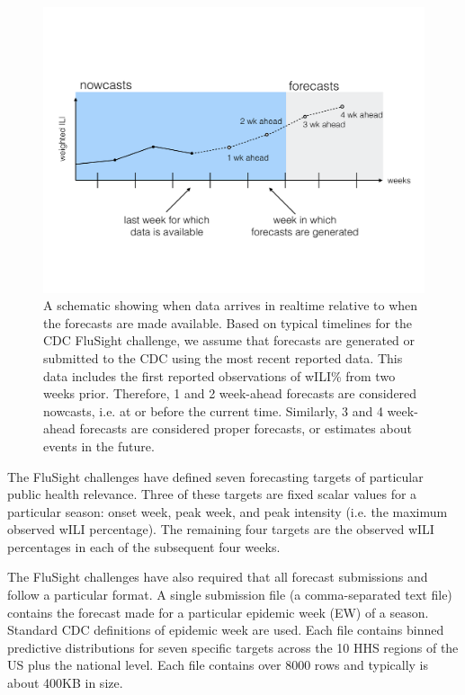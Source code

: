 \documentclass{article}\usepackage[]{graphicx}\usepackage[]{color}
\begin{document}
\begin{figure}[htbp]
\begin{center}
\includegraphics[width=\textwidth]{static-figures/timezero-sketch.pdf}
\caption{A schematic showing when data arrives in realtime relative to when the forecasts are made available. Based on typical timelines for the CDC FluSight challenge, we assume that forecasts are generated or submitted to the CDC using the most recent reported data. This data includes the first reported observations of wILI\% from two weeks prior. Therefore, 1 and 2 week-ahead forecasts are considered nowcasts, i.e. at or before the current time. Similarly, 3 and 4 week-ahead forecasts are considered proper forecasts, or estimates about events in the future.}
\label{fig:timezero-schematic}
\end{center}
\end{figure}


The FluSight challenges have defined seven forecasting targets of particular public health relevance. Three of these targets are fixed scalar values for a particular season: onset week, peak week, and peak intensity (i.e. the maximum observed wILI percentage). The remaining four targets are the observed wILI percentages in each of the subsequent four weeks. 

The FluSight challenges have also required that all forecast submissions and follow a particular format. A single submission file (a comma-separated text file) contains the forecast made for a particular epidemic week (EW) of a season. Standard CDC definitions of epidemic week are used. Each file contains binned predictive distributions for seven specific targets across the 10 HHS regions of the US plus the national level. Each file contains over 8000 rows and typically is about 400KB in size.
\end{document}
